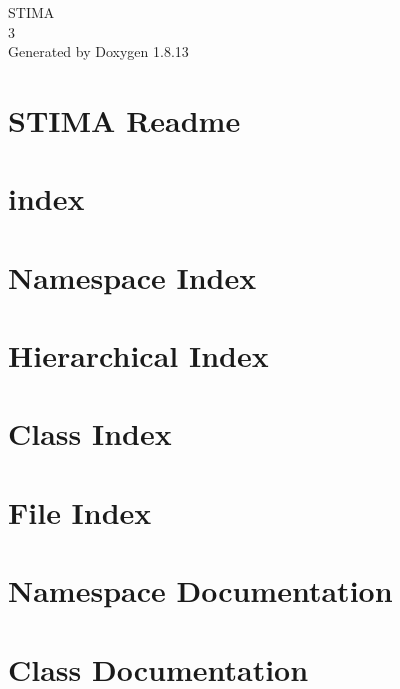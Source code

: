 \documentclass[twoside]{book}
\newcommand{\+}{\discretionary{\mbox{\scriptsize$\hookleftarrow$}}{}{}}
\newcommand{\clearemptydoublepage}{%
  \newpage{\pagestyle{empty}\cleardoublepage}%
}
\begin{document}
\hypersetup{pageanchor=false,
             bookmarksnumbered=true,
             pdfencoding=unicode
            }
\begin{titlepage}
\vspace*{7cm}
\begin{center}%
{\Large S\+T\+I\+MA \\[1ex]\large 3 }\\
\vspace*{1cm}
{\large Generated by Doxygen 1.8.13}\\
\end{center}
\end{titlepage}
\clearemptydoublepage
{}
\tableofcontents
\clearemptydoublepage
{}
\hypersetup{pageanchor=true}

\chapter{S\+T\+I\+MA Readme}
\label{index}\hypertarget{index}{}
\chapter{index}
\label{md_index}

\chapter{Namespace Index}

\chapter{Hierarchical Index}

\chapter{Class Index}

\chapter{File Index}

\chapter{Namespace Documentation}



\chapter{Class Documentation}






















\end{document}
